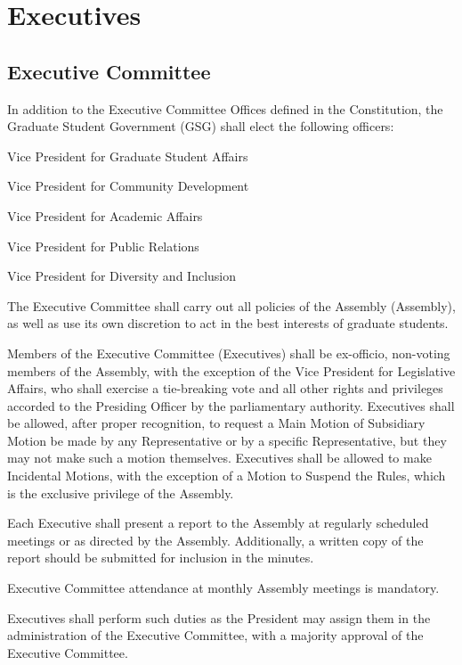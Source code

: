 \chapter{Executives}

\section{Executive Committee}
\begin{bylaws-number}
  \item In addition to the Executive Committee Offices defined in the Constitution, the Graduate Student Government (GSG) shall elect the following officers:
  \begin{bylaws-number}
    \item Vice President for Graduate Student Affairs
    \item Vice President for Community Development
    \item Vice President for Academic Affairs
    \item Vice President for Public Relations
    \item Vice President for Diversity and Inclusion
  \end{bylaws-number}
  \item The Executive Committee shall carry out all policies of the Assembly (Assembly), as well as use its own discretion to act in the best interests of graduate students.
  \item Members of the Executive Committee (Executives) shall be ex-officio, non-voting members of the Assembly, with the exception of the Vice President for Legislative Affairs, who shall exercise a tie-breaking vote and all other rights and privileges accorded to the Presiding Officer by the parliamentary authority. Executives shall be allowed, after proper recognition, to request a Main Motion of Subsidiary Motion be made by any Representative or by a specific Representative, but they may not make such a motion themselves. Executives shall be allowed to make Incidental Motions, with the exception of a Motion to Suspend the Rules, which is the exclusive privilege of the Assembly.
  \item Each Executive shall present a report to the Assembly at regularly scheduled meetings or as directed by the Assembly. Additionally, a written copy of the report should be submitted for inclusion in the minutes.
  \item Executive Committee attendance at monthly Assembly meetings is mandatory.
  \item Executives shall perform such duties as the President may assign them in the administration of the Executive Committee, with a majority approval of the Executive Committee.

\end{bylaws-number}
